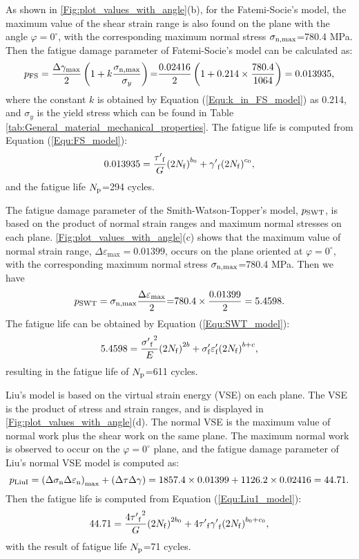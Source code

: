 As shown in \ref{Fig:plot_values_with_angle}(b), for the Fatemi-Socie's model, the maximum value of the shear strain range is also found on the plane with the angle $\varphi=0^\circ$, with the corresponding maximum normal stress ${{\sigma _{{\rm{n}},\max }}}$=780.4 MPa.
Then the fatigue damage parameter of Fatemi-Socie's model can be calculated as:
\[{p_{{\rm{FS}}}} = \frac{{\Delta {\gamma _{\max }}}}{2}\left( {1 + k\frac{{{\sigma _{{\rm{n}},\max }}}}{{{\sigma _y}}}} \right){\rm{ = }}\frac{{0.02416}}{2}\left( {1 + {\rm{0}}{\rm{.214}} \times \frac{{780.4}}{{1064}}} \right) = 0.013935,\]
where the constant $k$ is obtained by Equation (\ref{Equ:k_in_FS_model}) as 0.214, and ${\sigma _y}$ is the yield stress which can be found in Table \ref{tab:General_material_mechanical_properties}.
The fatigue life is computed from Equation (\ref{Equ:FS_model}):
\[0.013935 = \frac{{{{\tau '}_{\rm f}}}}{G}{\left( {2{N_{\rm f}}} \right)^{{b_0}}} + {{\gamma '}_{\rm f}}{\left( {2{N_{\rm f}}} \right)^{{c_0}}},\]
and the fatigue life $N_{\rm{p}}$=294 cycles.

The fatigue damage parameter of the Smith-Watson-Topper's model, $p_{\rm{SWT}}$, is based on the product of normal strain ranges and maximum normal stresses on each plane. \ref{Fig:plot_values_with_angle}(c) shows that the maximum value of normal strain range, ${\Delta {\varepsilon _{\max }}}=0.01399$, occurs on the plane oriented at $\varphi=0^\circ$, with the corresponding maximum normal stress ${{\sigma _{{\rm{n}},\max }}}$=780.4 MPa. Then we have
\[{p_{{\rm{SWT}}}} = {\sigma _{{\rm{n}},\max }}\frac{{\Delta {\varepsilon _{\max }}}}{2}{\rm{ = }}780.4 \times \frac{{0.01399}}{2} = 5.4598.\]
The fatigue life can be obtained by Equation (\ref{Equ:SWT_model}):
\[5.4598 = \frac{{{{\sigma '}_{\rm f}}^2}}{E}{\left( {2{N_{\rm f}}} \right)^{2b}} + {\sigma '_{\rm f}}{\varepsilon '_{\rm f}}{\left( {2{N_{\rm f}}} \right)^{b + c}},\]
resulting in the fatigue life of $N_{\rm{p}}$=611 cycles.

Liu's model is based on the virtual strain energy (VSE) on each plane. The VSE is the product of stress and strain ranges, and is displayed in \ref{Fig:plot_values_with_angle}(d). The normal VSE is the maximum value of normal work plus the shear work on the same plane. The maximum normal work is observed to occur on the $\varphi=0^\circ$ plane, and the fatigue damage parameter of Liu's normal VSE model is computed as:
\[{p_{{\rm{LiuI}}}} = {\left( {\Delta {\sigma _{\rm n}}\Delta {\varepsilon _{\rm n}}} \right)_{\max }} + \left( {\Delta \tau \Delta \gamma } \right) = 1857.4 \times 0.01399 + 1126.2 \times 0.02416 = 44.71.\]
Then the fatigue life is computed from Equation (\ref{Equ:Liu1_model}):
\[44.71 = \frac{{4{{\tau '}_{\rm f}}^2}}{G}{\left( {2{N_{\rm f}}} \right)^{2b_0 }} + 4{{\tau '}_{\rm f}}{{\gamma '}_{\rm f}}{\left( {2{N_{\rm f}}} \right)^{b_0  + c_0 }},\]
with the result of fatigue life $N_{\rm{p}}$=71 cycles.

